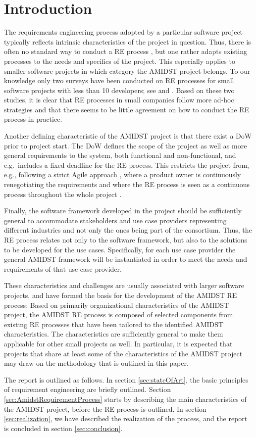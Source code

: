 \section{Introduction}

The requirements engineering process adopted by a particular software project typically reflects intrinsic
characteristics of the project in question. Thus, there is often no standard way to conduct a RE process \cite{Poh10}, but one rather adapts existing processes to the needs and specifics of the project. This
especially applies to smaller software projects in which category the AMIDST project belongs. To our
knowledge only two surveys have been conducted on RE processes for small software projects with less than 10 developers;
see \cite{Qui10} and \cite{Ara07}.  Based on these two studies, it is clear that RE processes in small companies follow
more ad-hoc strategies and that there seems to be little agreement on how to conduct the RE process in practice. 
 
Another defining characteristic of the AMIDST project is that there exist a DoW prior to project start.  The DoW defines the scope of the project as well as more general requirements to the system, both functional and non-functional, and e.g.\ includes a fixed deadline for the RE process. This restricts the project from, e.g., following a strict Agile approach
\cite{Din10}, where a product owner is continuously renegotiating the requirements and where the RE process is seen as a
continuous process throughout the whole project \cite{Kav11}.

Finally, the software framework developed in the project should be sufficiently general to accommodate stakeholders and
use case providers representing different industries and not only the ones being part of the consortium. Thus, the RE
process relates not only to the software framework, but also to the solutions to be developed for the use
cases. Specifically, for each use case provider the general AMIDST framework will be instantiated in order to meet the
needs and requirements of that use case provider.    

These characteristics and challenges are usually associated with larger software projects, and have  formed
the basis for the development of the AMIDST RE process: Based on primarily organizational characteristics of the AMIDST
project, the AMIDST RE process is composed of selected components from existing RE processes that have been tailored to the identified AMIDST characteristics. The characteristics are sufficiently general to make them
applicable for other small projects as well.  In particular, it is expected that projects that share at least some of the characteristics of the AMIDST project may draw on the methodology that is outlined in this paper.

The report is outlined as follows.  In section \ref{sec:stateOfArt}, the basic principles of requirement engineering are
briefly outlined.  Section \ref{sec:AmidstRequirementProcess} starts by describing the main characteristics of the
AMIDST project, before the RE process is outlined.  In section \ref{sec:realization}, we have described the realization
of the process, and the report is concluded in section \ref{sec:conclusion}. 
